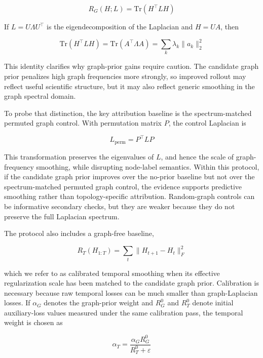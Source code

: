 \documentclass[preprint,12pt]{elsarticle}
\begin{document}
\begin{equation}
R_G(H;L)=\mathrm{Tr}(H^\top L H)
\end{equation}

If $L = U \Lambda U^\top$ is the eigendecomposition of the Laplacian and $H = U A$, then

\begin{equation}
\mathrm{Tr}(H^\top L H)=\mathrm{Tr}(A^\top \Lambda A)=\sum_k \lambda_k \lVert a_k \rVert_2^2
\end{equation}

This identity clarifies why graph-prior gains require caution. The candidate graph prior penalizes high graph frequencies more strongly, so improved rollout may reflect useful scientific structure, but it may also reflect generic smoothing in the graph spectral domain.

To probe that distinction, the key attribution baseline is the spectrum-matched permuted graph control. With permutation matrix $P$, the control Laplacian is

\begin{equation}
L_{\mathrm{perm}}=P^\top L P
\end{equation}

This transformation preserves the eigenvalues of $L$, and hence the scale of graph-frequency smoothing, while disrupting node-label semantics. Within this protocol, if the candidate graph prior improves over the no-prior baseline but not over the spectrum-matched permuted graph control, the evidence supports predictive smoothing rather than topology-specific attribution. Random-graph controls can be informative secondary checks, but they are weaker because they do not preserve the full Laplacian spectrum.

The protocol also includes a graph-free baseline,

\begin{equation}
R_T(H_{1:T})=\sum_t \lVert H_{t+1}-H_t \rVert_F^2
\end{equation}

which we refer to as calibrated temporal smoothing when its effective regularization scale has been matched to the candidate graph prior. Calibration is necessary because raw temporal losses can be much smaller than graph-Laplacian losses. If $\alpha_G$ denotes the graph-prior weight and $R_G^0$ and $R_T^0$ denote initial auxiliary-loss values measured under the same calibration pass, the temporal weight is chosen as

\begin{equation}
\alpha_T = \frac{\alpha_G R_G^0}{R_T^0+\varepsilon}
\end{equation}
\end{document}
